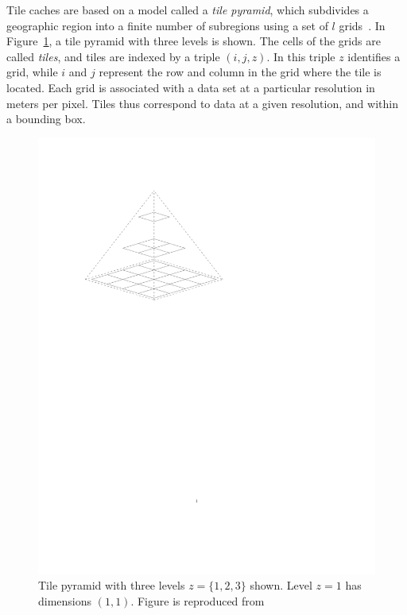 \documentclass[11pt, oneside]{report}
\begin{document}
Tile caches are based on a model called a \emph{tile pyramid}, which subdivides a geographic region into a finite number of subregions using a set of $l$ grids~\cite{decola93}. In Figure~\ref{fig:tilepyramid}, a tile pyramid with three levels is shown. The cells of the grids are called \emph{tiles}, and tiles are indexed by a triple $(i,j,z)$. In this triple $z$ identifies a grid, while $i$ and $j$ represent the row and column in the grid where the tile is located. Each grid is associated with a data set at a particular resolution in meters per pixel. Tiles thus correspond to data at a given resolution, and within a bounding box.

\begin{figure}
\centering
\includegraphics[scale=0.8]{figs-tileheat/tilepyramid}
\caption{Tile pyramid with three levels $z=\{1, 2, 3\}$ shown. Level $z=1$ has dimensions $(1,1)$. Figure is reproduced from \cite{quinn10}}
\label{fig:tilepyramid}
\end{figure}
\end{document}
